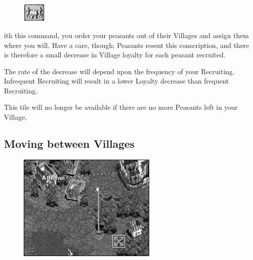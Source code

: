 
\begin{figure}
    \vspace{-20pt}
    \begin{center}
        \includegraphics[width=0.1\textwidth]{Trecruit}
    \end{center}
    \vspace{-20pt}
\end{figure}


ith this command, you order your peasants out of their Villages and assign them where you will. Have a care, though; Peasants resent this conscription, and there is therefore a small decrease in Village loyalty for each peasant recruited.

The rate of the decrease will depend upon the frequency of your Recruiting. Infrequent Recruiting will result in a lower Loyalty decrease than frequent Recruiting.

This tile will no longer be available if there are no more Peasants left in your Village.

\subsection{\textsf{Moving between Villages}}


\begin{figure}
    \vspace{-20pt}
    \begin{center}
        \includegraphics[width=0.6\textwidth]{Ivillage_villagelink} %
    \end{center}
    \vspace{-20pt}
\end{figure}

